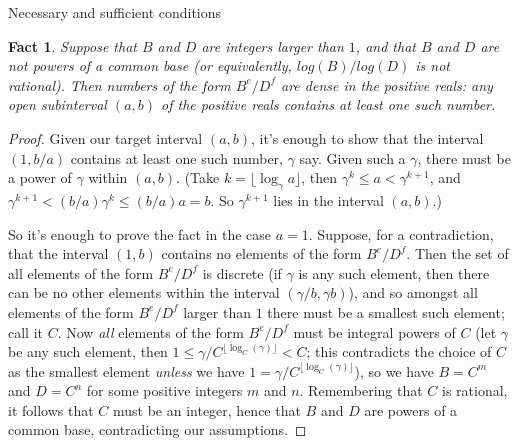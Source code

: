 \documentclass{article}
\theoremstyle{plain}
\newtheorem{fact}[lemma]{Fact}
\theoremstyle{definition}
\begin{document}
\begin{section}{Necessary and sufficient conditions}
\begin{fact}\label{dense_power_ratios}
  Suppose that $B$ and $D$ are integers larger than $1$, and that $B$ and $D$
  are not powers of a common base (or equivalently, $log(B) / log(D)$ is not
  rational). Then numbers of the form $B^e / D^f$ are \emph{dense} in the
  positive reals: any open subinterval $(a, b)$ of the positive reals contains
  at least one such number.
\end{fact}

\begin{proof}
  Given our target interval $(a, b)$, it's enough to show that the interval
  $(1, b/a)$ contains at least one such number, $\gamma$ say.  Given such a
  $\gamma$, there must be a power of $\gamma$ within $(a, b)$. (Take $k =
  \lfloor \log_{\gamma}a\rfloor$, then $\gamma^k \le a < \gamma^{k+1}$, and
  $\gamma^{k+1} < (b/a)\gamma^k \le (b/a)a = b$. So $\gamma^{k+1}$ lies in the
  interval $(a, b)$.)

  So it's enough to prove the fact in the case $a=1$. Suppose, for a
  contradiction, that the interval $(1, b)$ contains no elements of the form
  $B^e / D^f$. Then the set of all elements of the form $B^e / D^f$ is discrete
  (if $\gamma$ is any such element, then there can be no other elements within
  the interval $(\gamma/b, \gamma b)$), and so amongst all elements of the form
  $B^e / D^f$ larger than $1$ there must be a smallest such element; call it
  $C$. Now \emph{all} elements of the form $B^e/D^f$ must be integral powers of
  $C$ (let $\gamma$ be any such element, then $1 \le \gamma /
  C^{\lfloor\log_C(\gamma)\rfloor} < C$; this contradicts the choice of $C$ as
  the smallest element \emph{unless} we have $1 = \gamma /
  C^{\lfloor\log_C(\gamma)\rfloor}$), so we have $B=C^m$ and $D=C^n$ for some
  positive integers $m$ and $n$. Remembering that $C$ is rational, it follows
  that $C$ must be an integer, hence that $B$ and $D$ are powers of a common
  base, contradicting our assumptions.
\end{proof}


\end{section}
\end{document}
